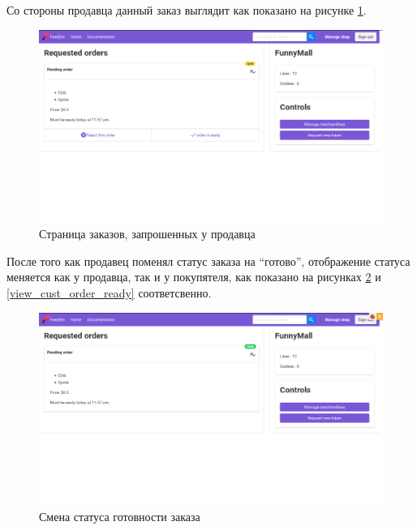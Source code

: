 {  Со стороны продавца данный заказ выглядит как показано на рисунке \ref{view_seller_orders}.
  \begin{figure}[H]
    \centering
    \includegraphics[width=\textwidth]{seller_orders.png}
    \caption{Страница заказов, запрошенных у продавца}
    \label{view_seller_orders}
  \end{figure}

  После того как продавец поменял статус заказа на \enquote{готово},
  отображение статуса меняется как у продавца, так и у покупятеля, как показано
  на рисунках \ref{view_seller_order_ready} и \ref{view_cust_order_ready} соответсвенно.

  \begin{figure}[H]
    \centering
    \includegraphics[width=\textwidth]{order_ready_seller.png}
    \caption{Смена статуса готовности заказа}
    \label{view_seller_order_ready}
  \end{figure}

}
